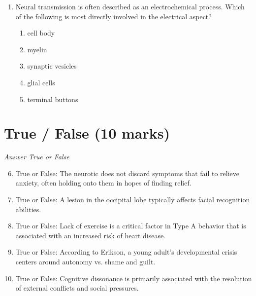 \documentclass[12pt]{article}
\begin{document}
\begin{enumerate}[label=\arabic*.]
\begin{enumerate}[label=(\alph*)]
    \item Triarchic theory of intelligence
    \item Multiple intelligences theory
    \item Cognitive development theory
    \item The positive manifold
    \item G theory
\end{enumerate}
\item Neural transmission is often described as an electrochemical process. Which of the following is most directly involved in the electrical aspect?
\begin{enumerate}[label=(\alph*)]
    \item cell body
    \item myelin
    \item synaptic vesicles
    \item glial cells
    \item terminal buttons
\end{enumerate}
\end{enumerate}

\section*{True / False (10 marks)}
\textit{Answer True or False}
\begin{enumerate}[label=\arabic*.]
\setcounter{enumi}{5}
\item True or False: The neurotic does not discard symptoms that fail to relieve anxiety, often holding onto them in hopes of finding relief.
\item True or False: A lesion in the occipital lobe typically affects facial recognition abilities.
\item True or False: Lack of exercise is a critical factor in Type A behavior that is associated with an increased risk of heart disease.
\item True or False: According to Erikson, a young adult's developmental crisis centers around autonomy vs. shame and guilt.
\item True or False: Cognitive dissonance is primarily associated with the resolution of external conflicts and social pressures.
\end{enumerate}
\end{document}
